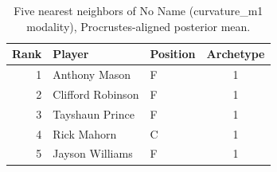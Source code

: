 \begin{table}[htbp]
  \centering\small
  \begin{tabular}{rllc}
    \toprule
    Rank & Player & Position & Archetype \\
    \midrule
    1 & Anthony Mason & F & 1 \\
    2 & Clifford Robinson & F & 1 \\
    3 & Tayshaun Prince & F & 1 \\
    4 & Rick Mahorn & C & 1 \\
    5 & Jayson Williams & F & 1 \\
    \bottomrule
  \end{tabular}
  \caption{Five nearest neighbors of No Name (curvature_m1 modality), Procrustes-aligned posterior mean.}
  \label{tab:No_Name_neighbors_curvature_m1}
\end{table}

